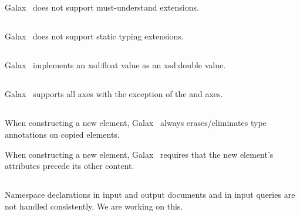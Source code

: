 \subsection*{}

   Galax \galaxversion\ does not support must-understand extensions.

\subsection*{}

   Galax \galaxversion\ does not support static typing extensions.

\subsection*{}

   Galax \galaxversion\ implements an xsd:float value as an xsd:double value.

\subsection*{}

   Galax \galaxversion\ supports all axes with the exception of the
    and  axes.

\subsection*{}

When constructing a new element, Galax \galaxversion\ always
erases/eliminates type annotations on copied elements.

When constructing a new element, Galax \galaxversion\ requires that 
the new element's attributes precede its other content. 

\subsection*{}

Namespace declarations in input and output documents and in input
queries are not handled consistently. 
We are working on
this.

